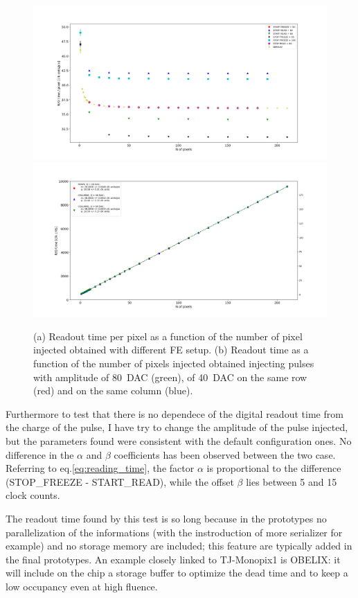     
        \begin{figure}[h!]
            \centering
            \includegraphics[width=.9\linewidth]{figures/charaterization/parameters_points.png}
            \includegraphics[width=.9\linewidth]{figures/charaterization/default_line.png}
            \caption{(a) Readout time per pixel as a function of the number of pixel injected obtained with different FE setup. (b) Readout time as a function of the number of pixels injected obtained injecting pulses with amplitude of \SI{80}{DAC} (green), of \SI{40}{DAC} on the same row (red) and on the same column (blue).}
            \label{fig:dead_time}
        \end{figure}
        Furthermore to test that there is no dependece of the digital readout time from the charge of the pulse, I have try to change the amplitude of the pulse injected, but the parameters found were consistent with the default configuration ones.
        No difference in the $\alpha$ and $\beta$ coefficients has been observed between the two case.
        Referring to eq.\ref{eq:reading_time}, the factor $\alpha$ is proportional to the difference (STOP\_FREEZE - START\_READ), while the offset $\beta$ lies between 5 and 15 clock counts.

        The readout time found by this test is so long because in the prototypes no parallelization of the informations (with the instroduction of more serializer for example) and no storage memory are included; this feature are typically added in the final prototypes. An example closely linked to TJ-Monopix1 is OBELIX: it will include on the chip a storage buffer to optimize the dead time and to keep a low occupancy even at high fluence. 


